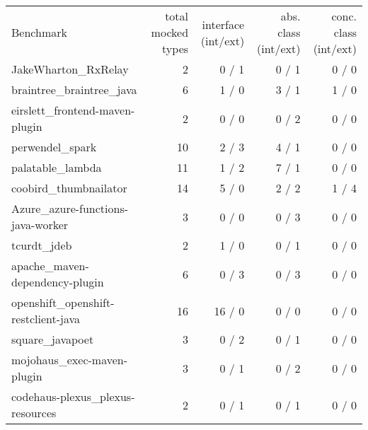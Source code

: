 \begin{table}[]
    \begin{tabular}{lrrrr}
        Benchmark                            & total mocked types & interface (int/ext) & abs. class (int/ext) & conc. class (int/ext) \\
        JakeWharton\_RxRelay                 & 2                  & 0 / 1               & 0 / 1                & 0 / 0                 \\
        braintree\_braintree\_java           & 6                  & 1 / 0               & 3 / 1                & 1 / 0                 \\
        eirslett\_frontend-maven-plugin      & 2                  & 0 / 0               & 0 / 2                & 0 / 0                 \\
        perwendel\_spark                     & 10                 & 2 / 3               & 4 / 1                & 0 / 0                 \\
        palatable\_lambda                    & 11                 & 1 / 2               & 7 / 1                & 0 / 0                 \\
        coobird\_thumbnailator               & 14                 & 5 / 0               & 2 / 2                & 1 / 4                 \\
        Azure\_azure-functions-java-worker   & 3                  & 0 / 0               & 0 / 3                & 0 / 0                 \\
        tcurdt\_jdeb                         & 2                  & 1 / 0               & 0 / 1                & 0 / 0                 \\
        apache\_maven-dependency-plugin      & 6                  & 0 / 3               & 0 / 3                & 0 / 0                 \\
        openshift\_openshift-restclient-java & 16                 & 16 / 0              & 0 / 0                & 0 / 0                 \\
        square\_javapoet                     & 3                  & 0 / 2               & 0 / 1                & 0 / 0                 \\
        mojohaus\_exec-maven-plugin          & 3                  & 0 / 1               & 0 / 2                & 0 / 0                 \\
        codehaus-plexus\_plexus-resources    & 2                  & 0 / 1               & 0 / 1                & 0 / 0                 \\

\end{tabular}
\end{table}
